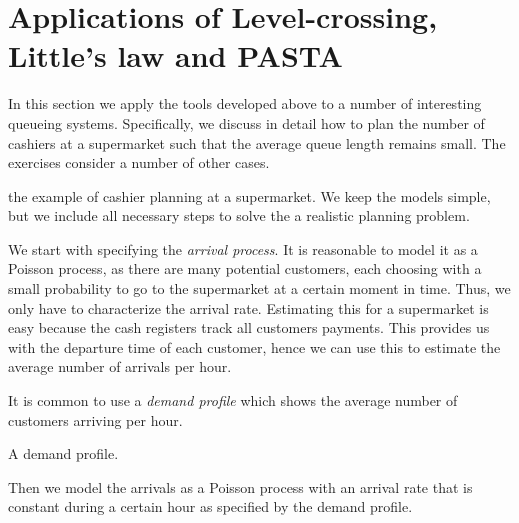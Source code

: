 


\section{Applications of Level-crossing, Little's law and PASTA}
\label{sec:mnmn1}

In this section we apply the tools developed above to a number of interesting queueing systems. Specifically, we discuss in detail how to plan the number of cashiers at a supermarket such that the average queue length remains small. The exercises consider a number of other cases.


 the example of cashier planning at a supermarket.
We keep the models simple, but we include  all  necessary steps to solve the a realistic planning problem.


We start with specifying the \emph{arrival process}.
It is reasonable to model it as a Poisson process, as there are many potential customers, each choosing with a small probability to go to the supermarket at a certain moment in time.
Thus, we only have to characterize the arrival rate.
Estimating this for a supermarket is easy because the cash registers track all customers payments.  This provides us with the departure time of each customer, hence we can use this to estimate the average number of arrivals per hour.

It is common to use a \emph{demand profile} which shows the average number of customers arriving per hour.
\begin{marginfigure}
\caption{A demand profile.}
\label{fig:loadprofile}
\end{marginfigure}
Then we model the arrivals as a Poisson process with an arrival rate that is constant during a certain hour as specified by the demand profile.


